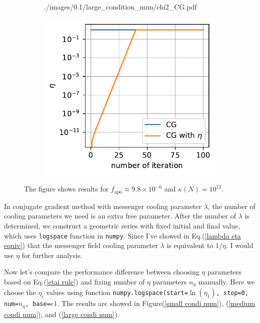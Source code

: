 \documentclass[11pt, letterpaper]{article}
\begin{document}
\begin{figure}[htb]
\begin{subfigure}{0.33\textwidth}
        {./images/0.1/large_condition_num/chi2_CG.pdf}
    \caption{}
    \label{large condi num chi2 CG}
\end{subfigure}%
\begin{subfigure}{0.33\textwidth}
    \centering
    \includegraphics[width=\linewidth]
        {./images/0.1/large_condition_num/eta_CG.pdf}
    \caption{}
    \label{large condi num eta CG}
\end{subfigure}
\caption{The figure shows results for $f_{\text{apo}}\approx 9.8\times10^{-6}$ 
    and $\kappa(N) = 10^{12}$.
}
\label{large condi num CG}
\end{figure}

In conjugate gradient method with messenger cooling parameter $\lambda$, 
the number of cooling parameters we need is an extra free parameter.
After the number of $\lambda$ is determined, we construct a geometric series
with fixed initial and final value, which uses \texttt{logspace}
function in \texttt{numpy}.
Since I've showed in Eq.(\ref{lambda eta equiv}) that the messenger field
cooling parameter $\lambda$ is equivalent to $1/\eta$.
I would use $\eta$ for further analysis.

Now let's compare the performance difference between choosing $\eta$
parameters based on Eq.(\ref{etai rule})
and fixing number of $\eta$ parameters $n_{\eta}$ manually.
Here we choose the $\eta_i$ values using function
\texttt{numpy.logspace(start=$\ln(\eta_1)$, stop=0, num=$n_{\eta}$, base=$e$)}.
The results are showed in Figure(\ref{small condi num}),
(\ref{medium condi num}), and (\ref{large condi num}).
\end{document}
